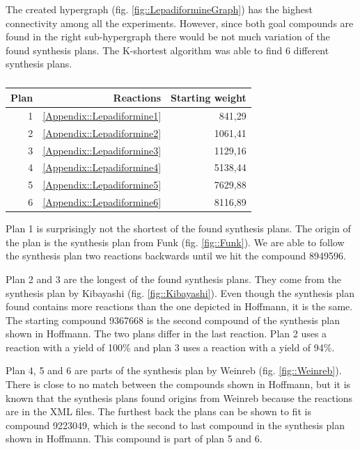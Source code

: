\documentclass[a4paper,10pt,titlepage]{paper}
\begin{document}
The created hypergraph (fig. \ref{fig::LepadiformineGraph}) has the highest connectivity among all the experiments. However, since both goal compounds are found in the right sub-hypergraph there would be not much variation of the found synthesis plans. The K-shortest algorithm was able to find 6 different synthesis plans. 

\begin{table}[H]
\centering
\begin{tabular}{|r|r|r|}
\hline
Plan & Reactions & Starting weight \\ \hline
1 & \ref{Appendix::Lepadiformine1} & 841,29 \\\hline
2 & \ref{Appendix::Lepadiformine2} & 1061,41 \\\hline
3 & \ref{Appendix::Lepadiformine3} & 1129,16 \\\hline
4 & \ref{Appendix::Lepadiformine4} & 5138,44 \\\hline
5 & \ref{Appendix::Lepadiformine5} & 7629,88 \\\hline
6 & \ref{Appendix::Lepadiformine6} & 8116,89 \\\hline
\end{tabular}
\caption{}
\end{table}

Plan 1 is surprisingly not the shortest of the found synthesis plans. The origin of the plan is the synthesis plan from Funk (fig. \ref{fig::Funk}). We are able to follow the synthesis plan two reactions backwards until we hit the compound 8949596. 

Plan 2 and 3 are the longest of the found synthesis plans. They come from the synthesis plan by Kibayashi (fig. \ref{fig::Kibayashi}). Even though the synthesis plan found contains more reactions than the one depicted in Hoffmann, it is the same. The starting compound 9367668 is the second compound of the synthesis plan shown in Hoffmann. The two plans differ in the last reaction. Plan 2 uses a reaction with a yield of 100\% and plan 3 uses a reaction with a yield of 94\%.

Plan 4, 5 and 6 are parts of the synthesis plan by Weinreb (fig. \ref{fig::Weinreb}). There is close to no match between the compounds shown in Hoffmann, but it is known that the synthesis plans found origins from Weinreb because the reactions are in the XML files. The furthest back the plans can be shown to fit is compound 9223049, which is the second to last compound in the synthesis plan shown in Hoffmann. This compound is part of plan 5 and 6.\\
\end{document}
